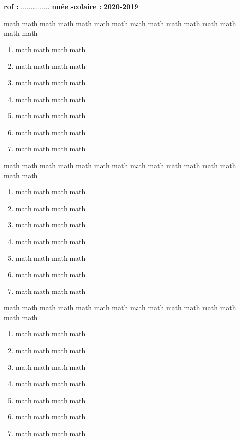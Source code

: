 \documentclass[12pt,a4paper]{article}
\begin{document}
 \begin{center}
\hfill \begin{minipage}{16cm}\color{red!55!black}
{\large  {{\fontsize{30}{1}
 \selectfont{P}}\normalfont \textbf{rof :}  
  ...............}}
  \hfill 
{\large  {{\fontsize{30}{1}
 \selectfont{A}}\normalfont \textbf{nnée scolaire : 2020-2019}}}
\end{minipage}
 \end{center} 
\vskip2.3cm
\begin{Exercice}
 math math math math math math math math math math math math math math math 
 \begin{enumerate}[label=\textbf{\color{col3}\arabic*.}]
 \item math math math math 
 \item math math math math 
 \item math math math math 
 \item math math math math 
 \item math math math math 
 \item math math math math 
 \item math math math math 
 \end{enumerate}
\end{Exercice}
\begin{Exercice}
math math math math math math math math math math math math math math math 
\begin{enumerate}[label=\textbf{\color{col3}\arabic*.}]
 \item math math math math 
 \item math math math math 
 \item math math math math 
 \item math math math math 
 \item math math math math 
 \item math math math math 
 \item math math math math 
\end{enumerate}
\end{Exercice}
\begin{Exercice}
math math math math math math math math math math math math math math math 
\begin{enumerate}[label=\textbf{\color{col3}\arabic*.}]
 \item math math math math 
 \item math math math math 
 \item math math math math 
 \item math math math math 
 \item math math math math 
 \item math math math math 
 \item math math math math 
\end{enumerate}
\end{Exercice}
\end{document}

